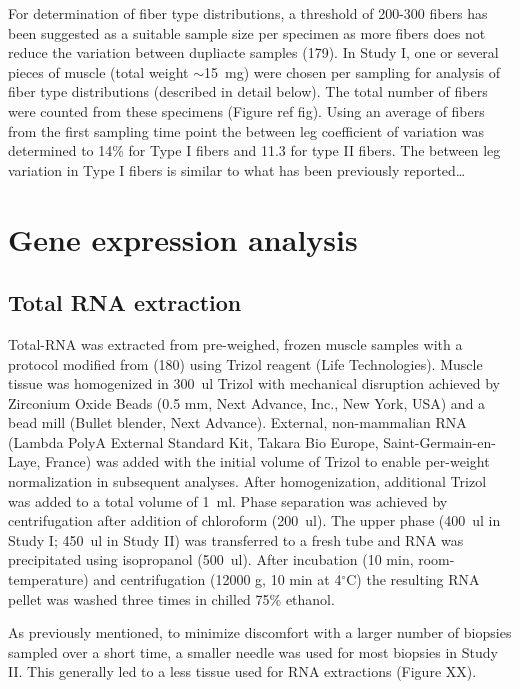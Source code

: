 \documentclass[twoside,10pt]{gihclass} %
\begin{document}
For determination of fiber type distributions, a threshold of 200-300
fibers has been suggested as a suitable sample size per specimen as more
fibers does not reduce the variation between dupliacte samples
(179).
In Study I, one or several pieces of muscle (total weight
\(\sim\)\SI{15}{mg}) were chosen per sampling for analysis of fiber type
distributions (described in detail below). The total number of fibers
were counted from these specimens (Figure ref fig). Using an average of
fibers from the first sampling time point the between leg coefficient of
variation was determined to 14\% for Type I fibers and 11.3 for type II
fibers. The between leg variation in Type I fibers is similar to what
has been previously reported\ldots{}

\hypertarget{gene-expression-analysis}{%
\section{Gene expression analysis}\label{gene-expression-analysis}}

\hypertarget{total-rna-extraction}{%
\subsection{Total RNA extraction}\label{total-rna-extraction}}

Total-RNA was extracted from pre-weighed, frozen muscle samples with a protocol modified from
(180)
using Trizol reagent (Life Technologies).
Muscle tissue was homogenized in \SI{300}{ul} Trizol with mechanical disruption achieved by Zirconium Oxide Beads (0.5 mm, Next Advance, Inc., New York, USA) and a bead mill (Bullet blender, Next Advance). External, non-mammalian RNA (Lambda PolyA External Standard Kit, Takara Bio Europe, Saint-Germain-en-Laye, France) was added with the initial volume of Trizol to enable per-weight normalization in subsequent analyses. After homogenization, additional Trizol was added to a total volume of \SI{1}{ml}. Phase separation was achieved by centrifugation after addition of chloroform (\SI{200}{ul}). The upper phase (\SI{400}{ul} in Study I; \SI{450}{ul} in Study II) was transferred to a fresh tube and RNA was precipitated using isopropanol (\SI{500}{ul}). After incubation (10 min, room-temperature) and centrifugation (12000 g, 10 min at 4\(^{\circ}\)C) the resulting RNA pellet was washed three times in chilled 75\% ethanol.

As previously mentioned, to minimize discomfort with a larger number of biopsies sampled over a short time, a smaller needle was used for most biopsies in Study II. This generally led to a less tissue used for RNA extractions (Figure XX).
\end{document}
